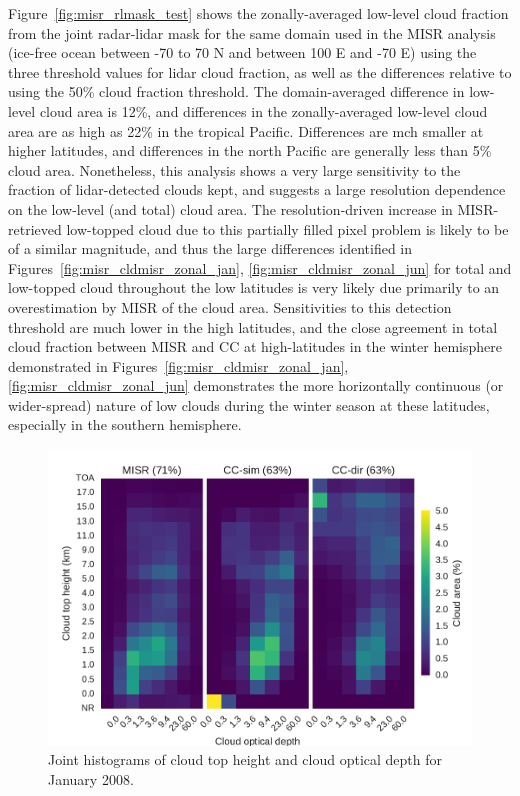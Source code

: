 Figure~\ref{fig:misr_rlmask_test} shows the zonally-averaged low-level
cloud fraction from the joint radar-lidar mask for the same domain used
in the MISR analysis (ice-free ocean between -70 to 70 N and between 100
E and -70 E) using the three threshold values for lidar cloud fraction,
as well as the differences relative to using the 50\% cloud fraction
threshold. The domain-averaged difference in low-level cloud area is
12\%, and differences in the zonally-averaged low-level cloud area are
as high as 22\% in the tropical Pacific. Differences are mch smaller at
higher latitudes, and differences in the north Pacific are generally
less than 5\% cloud area. Nonetheless, this analysis shows a very large
sensitivity to the fraction of lidar-detected clouds kept, and suggests
a large resolution dependence on the low-level (and total) cloud area.
The resolution-driven increase in MISR-retrieved low-topped cloud due to
this partially filled pixel problem is likely to be of a similar
magnitude, and thus the large differences identified in
Figures~\ref{fig:misr_cldmisr_zonal_jan}, \ref{fig:misr_cldmisr_zonal_jun}
for total and low-topped cloud throughout the low latitudes is very
likely due primarily to an overestimation by MISR of the cloud area.
Sensitivities to this detection threshold are much lower in the high
latitudes, and the close agreement in total cloud fraction between MISR
and CC at high-latitudes in the winter hemisphere demonstrated in
Figures~\ref{fig:misr_cldmisr_zonal_jan}, \ref{fig:misr_cldmisr_zonal_jun}
demonstrates the more horizontally continuous (or wider-spread) nature
of low clouds during the winter season at these latitudes, especially in
the southern hemisphere.

\begin{figure}[htbp]
\centering
\includegraphics{graphics/misr_clmisr_Pacific_2008-01.pdf}
\caption{\label{fig:misr_cthtau_Pacific_january}Joint histograms of
cloud top height and cloud optical depth for January
2008.}\label{fig:misrux5fcthtauux5fPacificux5fjanuary}
\end{figure}

